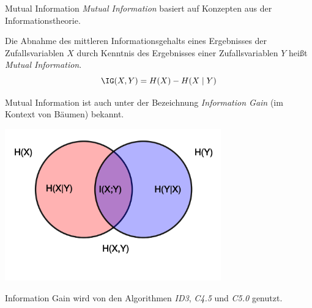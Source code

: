 \begin{defi}{Mutual Information}
    \emph{Mutual Information} basiert auf Konzepten aus der Informationstheorie.

    Die Abnahme des mittleren Informationsgehalts eines Ergebnisses der Zufallsvariablen $X$ durch Kenntnis des Ergebnisses einer Zufallsvariablen $Y$ heißt \emph{Mutual Information}.
    \[
        \IG(X, Y) = H(X) - H(X \mid Y)
    \]

    Mutual Information ist auch unter der Bezeichnung \emph{Information Gain} (im Kontext von Bäumen) bekannt.

    \begin{center}
        \includegraphics[width=0.7\textwidth]{includes/figures/defi_information_gain.png}
    \end{center}

    Information Gain wird von den Algorithmen \emph{ID3}, \emph{C4.5} und \emph{C5.0} genutzt.
\end{defi}


